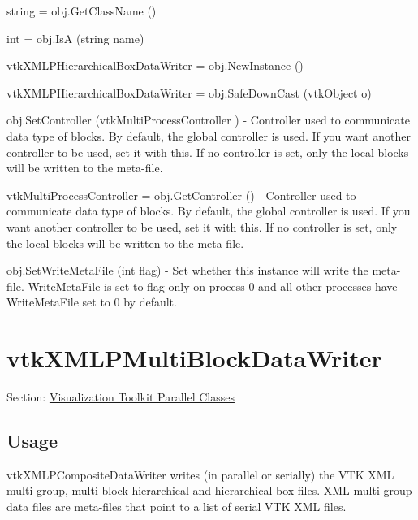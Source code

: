 \begin{DoxyItemize}
\item {\ttfamily string = obj.\-Get\-Class\-Name ()}  
\item {\ttfamily int = obj.\-Is\-A (string name)}  
\item {\ttfamily vtk\-X\-M\-L\-P\-Hierarchical\-Box\-Data\-Writer = obj.\-New\-Instance ()}  
\item {\ttfamily vtk\-X\-M\-L\-P\-Hierarchical\-Box\-Data\-Writer = obj.\-Safe\-Down\-Cast (vtk\-Object o)}  
\item {\ttfamily obj.\-Set\-Controller (vtk\-Multi\-Process\-Controller )} -\/ Controller used to communicate data type of blocks. By default, the global controller is used. If you want another controller to be used, set it with this. If no controller is set, only the local blocks will be written to the meta-\/file.  
\item {\ttfamily vtk\-Multi\-Process\-Controller = obj.\-Get\-Controller ()} -\/ Controller used to communicate data type of blocks. By default, the global controller is used. If you want another controller to be used, set it with this. If no controller is set, only the local blocks will be written to the meta-\/file.  
\item {\ttfamily obj.\-Set\-Write\-Meta\-File (int flag)} -\/ Set whether this instance will write the meta-\/file. Write\-Meta\-File is set to flag only on process 0 and all other processes have Write\-Meta\-File set to 0 by default.  
\end{DoxyItemize}\hypertarget{vtkparallel_vtkxmlpmultiblockdatawriter}{}\section{vtk\-X\-M\-L\-P\-Multi\-Block\-Data\-Writer}\label{vtkparallel_vtkxmlpmultiblockdatawriter}
Section\-: \hyperlink{sec_vtkparallel}{Visualization Toolkit Parallel Classes} \hypertarget{vtkwidgets_vtkxyplotwidget_Usage}{}\subsection{Usage}\label{vtkwidgets_vtkxyplotwidget_Usage}
vtk\-X\-M\-L\-P\-Composite\-Data\-Writer writes (in parallel or serially) the V\-T\-K X\-M\-L multi-\/group, multi-\/block hierarchical and hierarchical box files. X\-M\-L multi-\/group data files are meta-\/files that point to a list of serial V\-T\-K X\-M\-L files.

